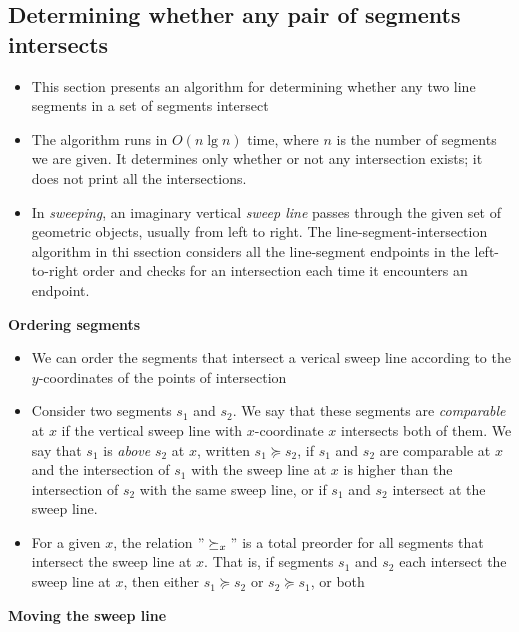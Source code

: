 \documentclass{report}
\begin{document}
\subsection*{Determining whether any pair of segments intersects}
\begin{itemize}
    \item This section presents an algorithm for determining whether any two line segments in a set of segments intersect
    \item The algorithm runs in $O(n \lg n)$ time, where $n$ is the number of segments we are given. It determines only whether or not any intersection exists; it does not print all the intersections.
    \item In \textit{sweeping}, an imaginary vertical \textit{sweep line} passes through the given set of geometric objects, usually from left to right. The line-segment-intersection algorithm in thi ssection considers all the line-segment endpoints in the left-to-right order and checks for an intersection each time it encounters an endpoint.
\end{itemize}
\textbf{Ordering segments}
\begin{itemize}
    \item We can order the segments that intersect a verical sweep line according to the $y$-coordinates of the points of intersection
    \item Consider two segments $s_1$ and $s_2$. We say that these segments are \textit{comparable} at $x$ if the vertical sweep line with $x$-coordinate $x$ intersects both of them. We say that $s_1$ is \textit{above} $s_2$ at $x$, written $s_1 \succeq s_2$, if $s_1$ and $s_2$ are comparable at $x$ and the intersection of $s_1$ with the sweep line at $x$ is higher than the intersection of $s_2$ with the same sweep line, or if $s_1$ and $s_2$ intersect at the sweep line.
    \item For a given $x$, the relation $"\succeq_x"$ is a total preorder for all segments that intersect the sweep line at $x$. That is, if segments $s_1$ and $s_2$ each intersect the sweep line at $x$, then either $s_1 \succeq s_2$ or $s_2 \succeq s_1$, or both
\end{itemize}
\textbf{Moving the sweep line}
\end{document}
